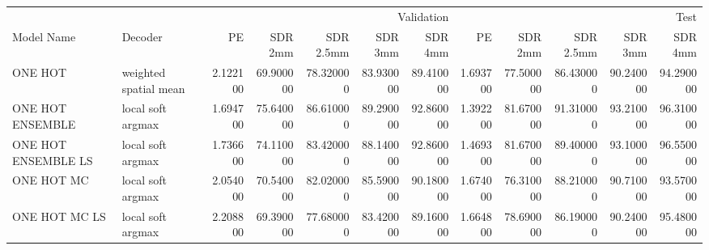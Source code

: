 \begin{tabular}{llrrrrrrrrrr}
\toprule
\multicolumn{2}{r}{} & \multicolumn{5}{r}{Validation} & \multicolumn{5}{r}{Test} \\
Model Name & Decoder & PE & SDR 2mm & SDR 2.5mm & SDR 3mm & SDR 4mm & PE & SDR 2mm & SDR 2.5mm & SDR 3mm & SDR 4mm \\
\midrule
ONE HOT & weighted spatial mean & 2.122100 & 69.900000 & 78.320000 & 83.930000 & 89.410000 & 1.693700 & 77.500000 & 86.430000 & 90.240000 & 94.290000 \\
ONE HOT ENSEMBLE & local soft argmax & 1.694700 & 75.640000 & 86.610000 & 89.290000 & 92.860000 & 1.392200 & 81.670000 & 91.310000 & 93.210000 & 96.310000 \\
ONE HOT ENSEMBLE LS & local soft argmax & 1.736600 & 74.110000 & 83.420000 & 88.140000 & 92.860000 & 1.469300 & 81.670000 & 89.400000 & 93.100000 & 96.550000 \\
ONE HOT MC & local soft argmax & 2.054000 & 70.540000 & 82.020000 & 85.590000 & 90.180000 & 1.674000 & 76.310000 & 88.210000 & 90.710000 & 93.570000 \\
ONE HOT MC LS & local soft argmax & 2.208800 & 69.390000 & 77.680000 & 83.420000 & 89.160000 & 1.664800 & 78.690000 & 86.190000 & 90.240000 & 95.480000 \\
\bottomrule
\end{tabular}

